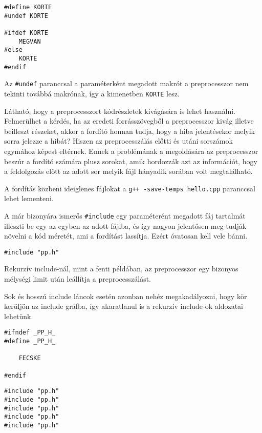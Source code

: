 \documentclass[a4paper,11.5pt,table]{article}
\begin{document}
	\begin{lstlisting}
#define KORTE
#undef KORTE

#ifdef KORTE
	MEGVAN
#else
	KORTE
#endif
	\end{lstlisting}
	Az \texttt{\#undef} paranccsal a paraméterként megadott makrót a preprocesszor nem tekinti továbbá makrónak, így a kimenetben \texttt{KORTE} lesz.
	
	Látható, hogy a preprocesszort kódrészletek kivágására is lehet használni. 
  Felmerülhet a kérdés, ha az eredeti forrásszövegből a preprocesszor kivág illetve beilleszt részeket, akkor a fordító honnan tudja, hogy a hiba jelentésekor melyik sorra jelezze a hibát? Hiszen az preprocesszálás előtti és utáni sorszámok egymához képest eltérnek. Ennek a problémának a megoldására az preprocesszor beszúr a fordító számára plusz sorokat, amik hordozzák azt az információt, hogy a feldolgozás előtt az adott sor melyik fájl hányadik sorában volt megtalálható. 
	\begin{note}
		 A fordítás közbeni ideiglenes fájlokat a \texttt{g++ -save-temps hello.cpp} paranccsal lehet lementeni.
	\end{note}
	A már bizonyára ismerős \texttt{\#include} egy paraméterént megadott fáj tartalmát illeszti be egy az egyben az adott fájlba, és így nagyon jelentősen meg tudják növelni a kód méretét, ami a fordítást lassítja. Ezért óvatosan kell vele bánni.
	\bigskip
	
	\begin{lstlisting}
#include "pp.h"
	\end{lstlisting}
		
	Rekurzív include-nál, mint a fenti példában, az preprocesszor egy bizonyos mélységi limit után leállítja a preprocesszálást.
	
	Sok és hosszú include láncok esetén azonban nehéz megakadályozni, hogy kör kerüljön az include gráfba, így akaratlanul is a rekurzív include-ok aldozatai lehetünk.
	\bigskip
	
	\begin{lstlisting}
#ifndef _PP_H_
#define _PP_H_

	FECSKE

#endif
	\end{lstlisting}
	
	\begin{lstlisting}
#include "pp.h"
#include "pp.h"
#include "pp.h"
#include "pp.h"
#include "pp.h"
	\end{lstlisting}
	
\end{document}
